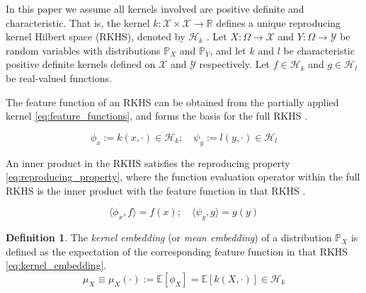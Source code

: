 \documentclass[twoside]{article} \usepackage{aistats2017}
\theoremstyle{definition}
\newtheorem{definition}{Definition}[section]
\theoremstyle{theorem}
\newcommand{\rv}[1]{{#1}}
\newcommand{\extra}[1]{{\color{ForestGreen} #1}}
\newcommand{\expect}[1]{{\mathbb{E}[#1]}}
\newcommand{\inner}[2]{{\langle #1, #2 \rangle}}
\newcommand{\Hk}{\mathcal{H}_{k}}
\newcommand{\Hl}{\mathcal{H}_{l}}
\newcommand{\muX}{\mu_{\rv{X}}}
\newcommand{\phiX}{\phi_{\rv{X}}}
\begin{document}
		In this paper we assume all kernels involved are positive definite and characteristic. That is, the kernel $k : \mathcal{X} \times \mathcal{X} \to \mathbb{R}$ defines a unique reproducing kernel Hilbert space (RKHS), denoted by $\mathcal{H}_{k}$ \citep{fukumizu2004dimensionality}. Let $\rv{X} : \Omega \to \mathcal{X}$ and $\rv{Y} : \Omega \to \mathcal{Y}$ be random variables with distributions $\mathbb{P}_{\rv{X}}$ and $\mathbb{P}_{\rv{Y}}$, and let $k$ and $l$ be characteristic positive definite kernels defined on $\mathcal{X}$ and $\mathcal{Y}$ respectively. Let $f \in \Hk$ and $g \in \Hl$ be real-valued functions.
		
		The feature function of an RKHS can be obtained from the partially applied kernel \eqref{eq:feature_functions}, and forms the basis for the full RKHS \citep{muandet2016kernel}.
			
		\begin{equation}
			\phi_{x} := k(x, \cdot) \in \Hk ;\quad \psi_{y} := l(y, \cdot) \in \Hl
		\label{eq:feature_functions}
		\end{equation}

		An inner product in the RKHS satisfies the reproducing property \eqref{eq:reproducing_property}, where the function evaluation operator within the full RKHS is the inner product with the feature function in that RKHS \citep{muandet2016kernel}.

		\begin{equation}
			\inner{\phi_{x}}{f} = f(x) ;\quad \inner{\psi_{y}}{g} = g(y)
		\label{eq:reproducing_property}
		\end{equation}
		
%
		
		\begin{definition} \label{def:kernel_embedding}
			\citep{smola2007hilbert}
			The \textit{kernel embedding} (or \textit{mean embedding}) of a distribution $\mathbb{P}_{\rv{X}}$ is defined as the expectation of the corresponding feature function in that RKHS \eqref{eq:kernel_embedding}.
			\begin{equation}
				\muX \equiv \muX(\cdot) := \expect{\phiX} = \expect{k(\rv{X}, \cdot)} \in \Hk
			\label{eq:kernel_embedding}
			\end{equation}
		\end{definition}
		
\end{document}
